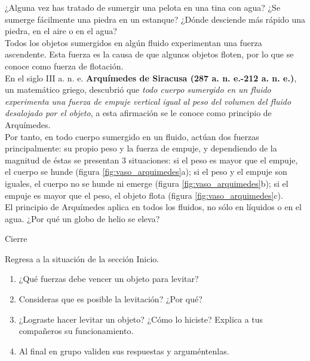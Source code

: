 \documentclass[11pt]{book}
\begin{document}
\begin{minipage}[t]{0.7\textwidth}
  ¿Alguna vez has tratado de sumergir una pelota en una tina con agua? ¿Se sumerge fácilmente una
  piedra en un estanque? ¿Dónde desciende más rápido una piedra, en el aire o en el agua?\\

  Todos los objetos sumergidos en algún fluido experimentan una fuerza ascendente. Esta fuerza es
  la causa de que algunos objetos floten, por lo que se conoce como fuerza de flotación.\\

  En el siglo III a. n. e. \textbf{Arquímedes de Siracusa (287 a. n. e.-212 a. n. e.)}, un matemático griego,
  descubrió que \emph{todo cuerpo sumergido en un fluido experimenta una fuerza de empuje vertical
    igual al peso del volumen del fluido desalojado por el objeto}, a esta afirmación se le conoce
  como principio de Arquímedes.\\

  Por tanto, en todo cuerpo sumergido en un fluido, actúan dos fuerzas principalmente: su propio
  peso y la fuerza de empuje, y dependiendo de la magnitud de éstas se presentan 3 situaciones:
  si el peso es mayor que el empuje, el cuerpo se hunde (figura \ref{fig:vaso_arquimedes}a); si el peso y el empuje son
  iguales, el cuerpo no se hunde ni emerge (figura \ref{fig:vaso_arquimedes}b); si el empuje es mayor que el peso, el
  objeto flota (figura \ref{fig:vaso_arquimedes}c).\\

  El principio de Arquímedes aplica en todos los fluidos, no sólo en líquidos o en el agua. ¿Por
  qué un globo de helio se eleva?\\
\end{minipage}

\begin{boxF}
  \begin{center}\color{colorrds}Cierre\end{center}
  Regresa a la situación de la sección Inicio.
  \begin{enumerate}
    \item ¿Qué fuerzas debe vencer un objeto para levitar?
    \item Consideras que es posible la levitación? ¿Por qué?
    \item ¿Lograste hacer levitar un objeto? ¿Cómo lo hiciste? Explica a tus compañeros su funcionamiento.
    \item Al final en grupo validen sus respuestas y arguméntenlas.
  \end{enumerate}
\end{boxF}
\newpage
\end{document}
